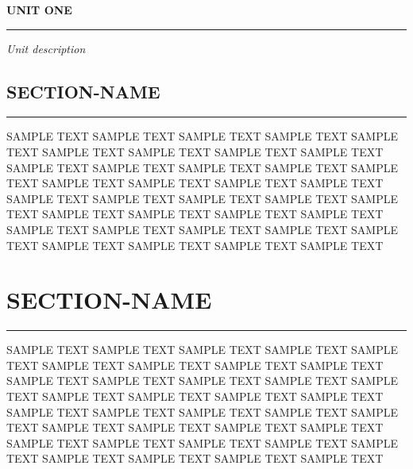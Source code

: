 \documentclass[a4paper,12pt,twoside]{book}
\begin{document}
\normalsize

\tableofcontents
\newpage




\pagebreak
\hspace{0pt}
\vfill
\huge
{\bf{UNIT ONE}}
\vspace{8pt}
\hrule
\large
\begin{flushright}
{\emph{Unit description}}
\end{flushright}
\normalsize
\vfill
\hspace{0pt}
\pagebreak

\newpage

\begin{center}
\section*{SECTION-NAME}
\hrule
\vspace{5pt}
\end{center}

SAMPLE TEXT SAMPLE TEXT SAMPLE TEXT SAMPLE TEXT SAMPLE TEXT SAMPLE TEXT SAMPLE TEXT SAMPLE TEXT SAMPLE TEXT SAMPLE TEXT SAMPLE TEXT SAMPLE TEXT SAMPLE TEXT SAMPLE TEXT SAMPLE TEXT SAMPLE TEXT SAMPLE TEXT SAMPLE TEXT SAMPLE TEXT SAMPLE TEXT SAMPLE TEXT SAMPLE TEXT SAMPLE TEXT SAMPLE TEXT SAMPLE TEXT SAMPLE TEXT SAMPLE TEXT SAMPLE TEXT SAMPLE TEXT SAMPLE TEXT SAMPLE TEXT SAMPLE TEXT SAMPLE TEXT SAMPLE TEXT SAMPLE TEXT SAMPLE TEXT 

\newpage


{\centering
\section*{SECTION-NAME}
\hrule
}

\vspace{15pt}

SAMPLE TEXT SAMPLE TEXT SAMPLE TEXT SAMPLE TEXT SAMPLE TEXT SAMPLE TEXT SAMPLE TEXT SAMPLE TEXT SAMPLE TEXT SAMPLE TEXT SAMPLE TEXT SAMPLE TEXT SAMPLE TEXT SAMPLE TEXT SAMPLE TEXT SAMPLE TEXT SAMPLE TEXT SAMPLE TEXT SAMPLE TEXT SAMPLE TEXT SAMPLE TEXT SAMPLE TEXT SAMPLE TEXT SAMPLE TEXT SAMPLE TEXT SAMPLE TEXT SAMPLE TEXT SAMPLE TEXT SAMPLE TEXT SAMPLE TEXT SAMPLE TEXT SAMPLE TEXT SAMPLE TEXT SAMPLE TEXT SAMPLE TEXT SAMPLE TEXT

\newpage

\end{document}
